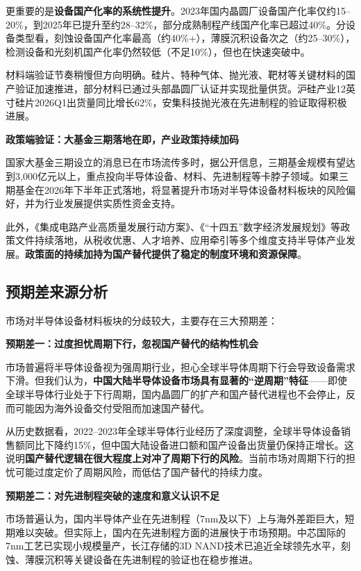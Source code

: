 更重要的是\textbf{设备国产化率的系统性提升}。2023年国内晶圆厂设备国产化率仅约15--20\%，到2025年已提升至约28--32\%，部分成熟制程产线国产化率已超过40\%。分设备类型看，刻蚀设备国产化率最高（约40\%+），薄膜沉积设备次之（约25--30\%），检测设备和光刻机国产化率仍然较低（不足10\%），但也在快速突破中。

材料端验证节奏稍慢但方向明确。硅片、特种气体、抛光液、靶材等关键材料的国产验证加速推进，部分材料已通过头部晶圆厂认证并实现批量供货。沪硅产业12英寸硅片2026Q1出货量同比增长62\%，安集科技抛光液在先进制程的验证取得积极进展。

\textbf{政策端验证：大基金三期落地在即，产业政策持续加码}

国家大基金三期设立的消息已在市场流传多时，据公开信息，三期基金规模有望达到3,000亿元以上，重点投向半导体设备、材料、先进制程等卡脖子领域。如果三期基金在2026年下半年正式落地，将显著提升市场对半导体设备材料板块的风险偏好，并为行业发展提供实质性资金支持。

此外，《集成电路产业高质量发展行动方案》、《“十四五”数字经济发展规划》等政策文件持续落地，从税收优惠、人才培养、应用牵引等多个维度支持半导体产业发展。\textbf{政策面的持续加持为国产替代提供了稳定的制度环境和资源保障}。

\subsection{预期差来源分析}

市场对半导体设备材料板块的分歧较大，主要存在三大预期差：

\textbf{预期差一：过度担忧周期下行，忽视国产替代的结构性机会}

市场普遍将半导体设备视为强周期行业，担心全球半导体周期下行会导致设备需求下滑。但我们认为，\textbf{中国大陆半导体设备市场具有显著的“逆周期”特征}——即使全球半导体行业处于下行周期，国内晶圆厂的扩产和国产替代进程也不会停止，反而可能因为海外设备交付受阻而加速国产替代。

从历史数据看，2022--2023年全球半导体行业经历了深度调整，全球半导体设备销售额同比下降约15\%，但中国大陆设备进口额和国产设备出货量仍保持正增长。这说明\textbf{国产替代逻辑在很大程度上对冲了周期下行的风险}。当前市场对周期下行的担忧可能过度定价了周期风险，而低估了国产替代的持续力度。

\textbf{预期差二：对先进制程突破的速度和意义认识不足}

市场普遍认为，国内半导体产业在先进制程（7nm及以下）上与海外差距巨大，短期难以突破。但实际上，国内在先进制程方面的进展快于市场预期。中芯国际的7nm工艺已实现小规模量产，长江存储的3D NAND技术已追近全球领先水平，刻蚀、薄膜沉积等关键设备在先进制程的验证也在稳步推进。

